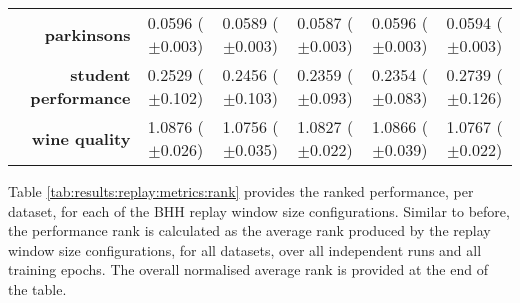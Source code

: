 \begin{table}[htb]
{\begin{tabular}{r|ccccc}
			\textbf{parkinsons}          & \cellcolor[rgb]{ .973,  .412,  .42}0.0596 ($\pm$0.003)  & \cellcolor[rgb]{ .576,  .8,  .49}0.0589 ($\pm$0.003)    & \cellcolor[rgb]{ .388,  .745,  .482}0.0587 ($\pm$0.003) & \cellcolor[rgb]{ .976,  .424,  .424}0.0596 ($\pm$0.003) & \cellcolor[rgb]{ 1,  .922,  .518}0.0594 ($\pm$0.003)    \\
			\textbf{student performance} & \cellcolor[rgb]{ .996,  .792,  .494}0.2529 ($\pm$0.102) & \cellcolor[rgb]{ 1,  .922,  .518}0.2456 ($\pm$0.103)    & \cellcolor[rgb]{ .42,  .753,  .482}0.2359 ($\pm$0.093)  & \cellcolor[rgb]{ .388,  .745,  .482}0.2354 ($\pm$0.083) & \cellcolor[rgb]{ .973,  .412,  .42}0.2739 ($\pm$0.126)  \\
			\textbf{wine quality}        & \cellcolor[rgb]{ .973,  .412,  .42}1.0876 ($\pm$0.026)  & \cellcolor[rgb]{ .388,  .745,  .482}1.0756 ($\pm$0.035) & \cellcolor[rgb]{ 1,  .922,  .518}1.0827 ($\pm$0.022)    & \cellcolor[rgb]{ .98,  .522,  .443}1.0866 ($\pm$0.039)  & \cellcolor[rgb]{ .482,  .773,  .486}1.0767 ($\pm$0.022) \\
		\end{tabular}%
	}
\end{table}%

Table \ref{tab:results:replay:metrics:rank} provides the ranked performance, per dataset, for each of the \acs{BHH} replay window size configurations. Similar to before, the performance rank is calculated as the average rank produced by the replay window size configurations, for all datasets, over all independent runs and all training epochs. The overall normalised average rank is provided at the end of the table.

